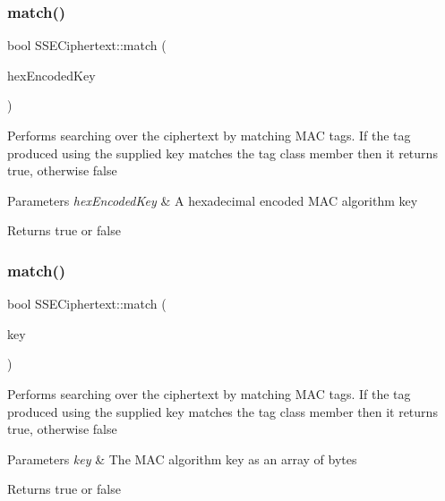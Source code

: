 \subsubsection{\texorpdfstring{match()}{match()}\hspace{0.1cm}{\footnotesize\ttfamily [1/2]}}
{\footnotesize\ttfamily bool S\+S\+E\+Ciphertext\+::match (\begin{DoxyParamCaption}\item[{std\+::string \&}]{hex\+Encoded\+Key }\end{DoxyParamCaption})}

Performs searching over the ciphertext by matching M\+AC tags. If the tag produced using the supplied key matches the {\ttfamily tag} class member then it returns {\ttfamily true}, otherwise {\ttfamily false} 
\begin{DoxyParams}{Parameters}
{\em hex\+Encoded\+Key} & A hexadecimal encoded M\+AC algorithm key \\
\hline
\end{DoxyParams}
\begin{DoxyReturn}{Returns}
{\ttfamily true} or {\ttfamily false} 
\end{DoxyReturn}
\mbox{\label{classSSECiphertext_abc37153050ef9bbf76638dd3c64c8a16}} 
\subsubsection{\texorpdfstring{match()}{match()}\hspace{0.1cm}{\footnotesize\ttfamily [2/2]}}
{\footnotesize\ttfamily bool S\+S\+E\+Ciphertext\+::match (\begin{DoxyParamCaption}\item[{Crypto\+P\+P\+::\+Sec\+Byte\+Block \&}]{key }\end{DoxyParamCaption})}

Performs searching over the ciphertext by matching M\+AC tags. If the tag produced using the supplied key matches the {\ttfamily tag} class member then it returns {\ttfamily true}, otherwise {\ttfamily false} 
\begin{DoxyParams}{Parameters}
{\em key} & The M\+AC algorithm key as an array of bytes \\
\hline
\end{DoxyParams}
\begin{DoxyReturn}{Returns}
{\ttfamily true} or {\ttfamily false} 
\end{DoxyReturn}
\mbox{\label{classSSECiphertext_a8ef115f04a88ca1bc4e4e5ef619f5c93}} 
